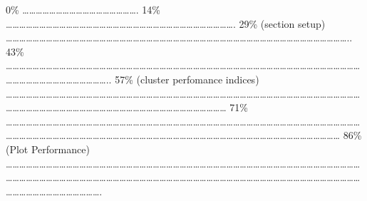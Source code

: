 \documentclass[
]{article}
\begin{document}
\textbar{} \textbar{} \textbar{} 0\% \textbar{}
\textbar\ldots\ldots\ldots\ldots\ldots\ldots\ldots\ldots\ldots\ldots\ldots\ldots\ldots\ldots\ldots\ldots\ldots.
\textbar{} 14\% \textbar{}
\textbar\ldots\ldots\ldots\ldots\ldots\ldots\ldots\ldots\ldots\ldots\ldots\ldots\ldots\ldots\ldots\ldots\ldots\ldots\ldots\ldots\ldots\ldots\ldots\ldots\ldots\ldots\ldots\ldots\ldots\ldots\ldots\ldots\ldots\ldots.
\textbar{} 29\% (section setup) \textbar{}
\textbar\ldots\ldots\ldots\ldots\ldots\ldots\ldots\ldots\ldots\ldots\ldots\ldots\ldots\ldots\ldots\ldots\ldots\ldots\ldots\ldots\ldots\ldots\ldots\ldots\ldots\ldots\ldots\ldots\ldots\ldots\ldots\ldots\ldots\ldots\ldots\ldots\ldots\ldots\ldots\ldots\ldots\ldots\ldots\ldots\ldots\ldots\ldots\ldots\ldots\ldots\ldots..
\textbar{} 43\% \textbar{}
\textbar\ldots\ldots\ldots\ldots\ldots\ldots\ldots\ldots\ldots\ldots\ldots\ldots\ldots\ldots\ldots\ldots\ldots\ldots\ldots\ldots\ldots\ldots\ldots\ldots\ldots\ldots\ldots\ldots\ldots\ldots\ldots\ldots\ldots\ldots\ldots\ldots\ldots\ldots\ldots\ldots\ldots\ldots\ldots\ldots\ldots\ldots\ldots\ldots\ldots\ldots\ldots\ldots\ldots\ldots\ldots\ldots\ldots\ldots\ldots\ldots\ldots\ldots\ldots\ldots\ldots\ldots\ldots\ldots..
\textbar{} 57\% (cluster perfomance indices) \textbar{}
\textbar\ldots\ldots\ldots\ldots\ldots\ldots\ldots\ldots\ldots\ldots\ldots\ldots\ldots\ldots\ldots\ldots\ldots\ldots\ldots\ldots\ldots\ldots\ldots\ldots\ldots\ldots\ldots\ldots\ldots\ldots\ldots\ldots\ldots\ldots\ldots\ldots\ldots\ldots\ldots\ldots\ldots\ldots\ldots\ldots\ldots\ldots\ldots\ldots\ldots\ldots\ldots\ldots\ldots\ldots\ldots\ldots\ldots\ldots\ldots\ldots\ldots\ldots\ldots\ldots\ldots\ldots\ldots\ldots\ldots\ldots\ldots\ldots\ldots\ldots\ldots\ldots\ldots\ldots\ldots\ldots\ldots\ldots\ldots\ldots\ldots\ldots{}
\textbar{} 71\% \textbar{}
\textbar\ldots\ldots\ldots\ldots\ldots\ldots\ldots\ldots\ldots\ldots\ldots\ldots\ldots\ldots\ldots\ldots\ldots\ldots\ldots\ldots\ldots\ldots\ldots\ldots\ldots\ldots\ldots\ldots\ldots\ldots\ldots\ldots\ldots\ldots\ldots\ldots\ldots\ldots\ldots\ldots\ldots\ldots\ldots\ldots\ldots\ldots\ldots\ldots\ldots\ldots\ldots\ldots\ldots\ldots\ldots\ldots\ldots\ldots\ldots\ldots\ldots\ldots\ldots\ldots\ldots\ldots\ldots\ldots\ldots\ldots\ldots\ldots\ldots\ldots\ldots\ldots\ldots\ldots\ldots\ldots\ldots\ldots\ldots\ldots\ldots\ldots\ldots\ldots\ldots\ldots\ldots\ldots\ldots\ldots\ldots\ldots\ldots\ldots\ldots\ldots\ldots\ldots\ldots{}
\textbar{} 86\% (Plot Performance) \textbar{}
\textbar\ldots\ldots\ldots\ldots\ldots\ldots\ldots\ldots\ldots\ldots\ldots\ldots\ldots\ldots\ldots\ldots\ldots\ldots\ldots\ldots\ldots\ldots\ldots\ldots\ldots\ldots\ldots\ldots\ldots\ldots\ldots\ldots\ldots\ldots\ldots\ldots\ldots\ldots\ldots\ldots\ldots\ldots\ldots\ldots\ldots\ldots\ldots\ldots\ldots\ldots\ldots\ldots\ldots\ldots\ldots\ldots\ldots\ldots\ldots\ldots\ldots\ldots\ldots\ldots\ldots\ldots\ldots\ldots\ldots\ldots\ldots\ldots\ldots\ldots\ldots\ldots\ldots\ldots\ldots\ldots\ldots\ldots\ldots\ldots\ldots\ldots\ldots\ldots\ldots\ldots\ldots\ldots\ldots\ldots\ldots\ldots\ldots\ldots\ldots\ldots\ldots\ldots\ldots\ldots\ldots\ldots\ldots\ldots\ldots\ldots\ldots\ldots\ldots\ldots\ldots\ldots\ldots\ldots\ldots\ldots.\textbar{}
\end{document}
